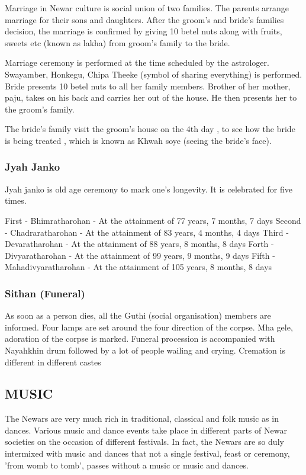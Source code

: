 \documentclass[a4paper,13pt, margin=0.9in]{article}
\begin{document}
\begin{flushleft}
	Marriage in Newar culture is social union of two families. The parents arrange marriage for their sons and daughters. After the groom's and bride's families decision, the marriage is confirmed by giving 10 betel nuts along with fruits, sweets etc (known as lakha) from groom's family to the bride.

	Marriage ceremony is performed at the time scheduled by the astrologer. Swayamber, Honkegu, Chipa Theeke (symbol of sharing everything) is performed. Bride presents 10 betel nuts to all her family members. Brother of her mother, paju, takes on his back and carries her out of the house. He then presents her to the groom's family.

	The bride's family visit the groom's house on the 4th day , to see how the bride is being treated , which is known as Khwah soye (seeing the bride's face).

	\subsubsection{Jyah Janko}

	Jyah janko is old age ceremony to mark one's longevity. It is celebrated for five times.

	First - Bhimratharohan - At the attainment of 77 years, 7 months, 7 days
	Second - Chadraratharohan - At the attainment of 83 years, 4 months, 4 days
	Third - Devaratharohan - At the attainment of 88 years, 8 months, 8 days
	Forth - Divyaratharohan - At the attainment of 99 years, 9 months, 9 days
	Fifth - Mahadivyaratharohan - At the attainment of 105 years, 8 months, 8 days

	\subsubsection{Sithan (Funeral)}

	As soon as a person dies, all the Guthi (social organisation) members are informed. Four lamps are set around the four direction of the corpse. Mha gele, adoration of the corpse is marked. Funeral procession is accompanied with Nayahkhin drum followed by a lot of people wailing and crying. Cremation is different in different castes


	\newpage

	\subsection{MUSIC}
	The Newars are very much rich in traditional, classical and folk music as in dances. Various music and dance events take place in different parts of Newar societies on the occasion of different festivals. In fact, the Newars are so duly intermixed with music and dances that not a single festival, feast or ceremony, 'from womb to tomb', passes without a music or music and dances.


\end{flushleft}
\end{document}
